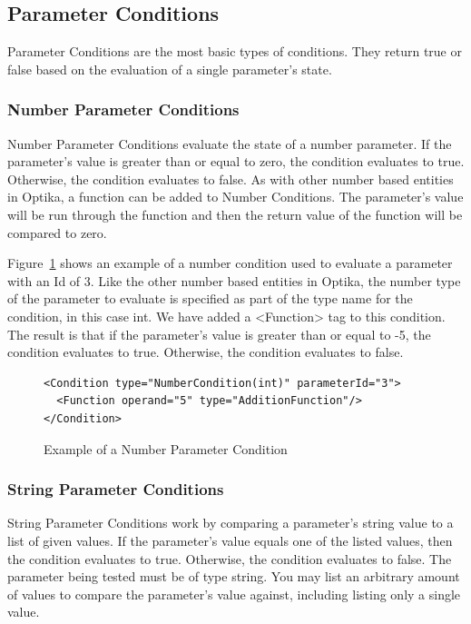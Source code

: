 \subsection{Parameter Conditions}
Parameter Conditions are the most basic types of conditions. They return true or false based on the evaluation of a single parameter's state.

\subsubsection{Number Parameter Conditions}
Number Parameter Conditions evaluate the state of a number parameter. If the parameter's value is greater than or equal to zero, the condition evaluates to true. Otherwise, the 
condition evaluates to false. As with other number based entities in Optika, a function can be added to Number Conditions. The parameter's value will be run through the 
function and then the return value of the function will be compared to zero.

Figure~\ref{simpleNumberCon} shows an example of a number condition used to evaluate a parameter with an Id of 3. Like the other number based entities in Optika, the number 
type of the parameter to evaluate is specified as part of the type name for the condition, in this case int. We have added a <Function> tag to this condition. The result is 
that if the parameter's value is greater than or equal to -5, the condition evaluates to true. Otherwise, the condition evaluates to false.
\begin{figure}
\centering
{\footnotesize
\begin{Verbatim}
<Condition type="NumberCondition(int)" parameterId="3">
  <Function operand="5" type="AdditionFunction"/>
</Condition>
\end{Verbatim}
}
\caption{Example of a Number Parameter Condition}
\label{simpleNumberCon}
\end{figure}

\subsubsection{String Parameter Conditions}
String Parameter Conditions work by comparing a parameter's string value to a list of given values. If the parameter's value equals one of the listed values, then the
condition evaluates to true. Otherwise, the condition evaluates to false. The parameter being tested must be of type string. You may list an arbitrary amount of values to 
compare the parameter's value against, including listing only a single value.

